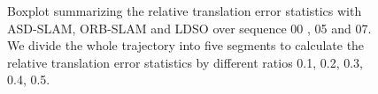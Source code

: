 \documentclass[letterpaper, 10 pt, conference]{ieeeconf}  %
\begin{document}
\begin{figure}[H]
\flushleft 
{}%
%

%
%

\caption{Boxplot summarizing the relative translation error statistics with ASD-SLAM, ORB-SLAM and LDSO over sequence 00 , 05 and 07. We divide the whole trajectory into five segments to  calculate the relative translation error statistics by different ratios 0.1, 0.2, 0.3, 0.4, 0.5. } 
\end{figure}
\end{document}
